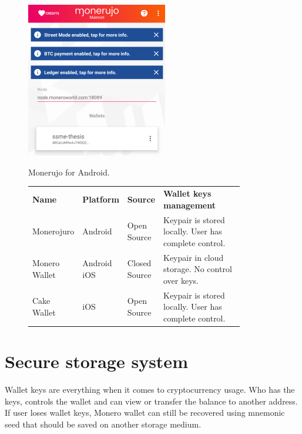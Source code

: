 \documentclass[
  printed, %
  table,   %
  nolof,     %
  nolot,     %
           oneside, color
]{fithesis3}
\begin{document}
\begin{figure}[H]
\begin{center}
\vspace{-0.75em}
 \includegraphics[trim={0 1.8cm 0 0},clip,width=0.55\textwidth]{Screenshot_1542566492.png}
    \caption{Monerujo for Android.}
    \vspace{-1.5em}
    \label{pic:withoutresdrawable}
\end{center}
    \end{figure}
 \vspace{-0.9em}
\begin{figure}[H]
\centering\begin{tabular}{p{0.2\linewidth}p{0.15\linewidth}p{0.1\linewidth}p{0.4\linewidth}}
\textbf{Name}         & \textbf{Platform}      & \textbf{Source}        & \textbf{Wallet keys management} \\
Monerojuro    & Android       & Open Source   & Keypair is stored locally.  User has complete control.                      \\
Monero Wallet & Android  iOS & Closed Source & Keypair in cloud storage. No control over keys. \\
Cake Wallet   & iOS           & Open Source   & Keypair is stored locally.  User has complete control.                           
\end{tabular}
\label{table:monero-mobile}
\end{figure}


\section{Secure storage system}
Wallet keys are everything when it comes to cryptocurrency usage. Who has the keys, controls the wallet and can view or transfer the balance to another address. If user loses wallet keys, Monero wallet can still be recovered using mnemonic seed that should be saved on another storage medium. 
\end{document}
